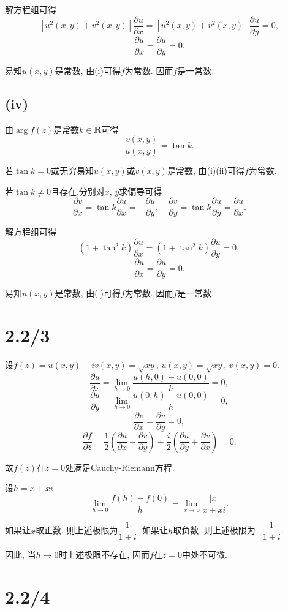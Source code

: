 \documentclass[11pt,a4paper]{article}
\begin{document}
解方程组可得
$$\left[u^2(x,y)+v^2(x,y)\right]\frac{\partial u}{\partial x}=\left[u^2(x,y)+v^2(x,y)\right]\frac{\partial u}{\partial y}=0,$$
$$\frac{\partial u}{\partial x}=\frac{\partial u}{\partial y}=0.$$

易知$u(x,y)$是常数, 由(i)可得$f$为常数. 因而$f$是一常数.

\subsection*{(iv)}

由$\arg f(z)$是常数$k\in\mathbf{R}$可得
$$\frac{v(x,y)}{u(x,y)}=\tan k.$$

若$\tan k=0$或无穷易知$u(x,y)$或$v(x,y)$是常数, 由(i)(ii)可得$f$为常数.

若$\tan k\neq0$且存在,分别对$x$, $y$求偏导可得
$$\frac{\partial v}{\partial x}=\tan k\frac{\partial u}{\partial x}=-\frac{\partial u}{\partial y},\quad\frac{\partial v}{\partial y}=\tan k\frac{\partial u}{\partial y}=\frac{\partial u}{\partial x}.$$

解方程组可得
$$(1+\tan^2k)\frac{\partial u}{\partial x}=(1+\tan^2k)\frac{\partial u}{\partial y}=0,$$
$$\frac{\partial u}{\partial x}=\frac{\partial u}{\partial y}=0.$$

易知$u(x,y)$是常数, 由(i)可得$f$为常数. 因而$f$是一常数.

\section{2.2/3}

设$f(z)=u(x,y)+iv(x,y)=\sqrt{xy}$, $u(x,y)=\sqrt{xy}$, $v(x,y)=0$.
$$\frac{\partial u}{\partial x}=\lim_{h\to0}\frac{u(h,0)-u(0,0)}{h}=0,$$
$$\frac{\partial u}{\partial y}=\lim_{h\to0}\frac{u(0,h)-u(0,0)}{h}=0,$$
$$\frac{\partial v}{\partial x}=\frac{\partial v}{\partial y}=0,$$
$$\frac{\partial f}{\partial\bar{z}}=\frac{1}{2}\left(\frac{\partial u}{\partial x}-\frac{\partial v}{\partial y}\right)+\frac{i}{2}\left(\frac{\partial u}{\partial y}+\frac{\partial v}{\partial x}\right)=0.$$

故$f(z)$在$z=0$处满足Cauchy-Riemann方程.

设$h=x+xi$
$$\lim_{h\to0}\frac{f(h)-f(0)}{h}=\lim_{x\to0}\frac{|x|}{x+xi}.$$

如果让$x$取正数, 则上述极限为$\dfrac{1}{1+i}$; 如果让$h$取负数, 则上述极限为$-\dfrac{1}{1+i}$.

因此, 当$h\to0$时上述极限不存在, 因而$f$在$z=0$中处不可微.

\section{2.2/4}
\end{document}
